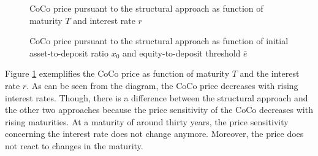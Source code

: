 \begin{figure}
\centering
    \caption[CoCo price pursuant to the structural approach as function of maturity and interest rate]{CoCo price pursuant to the structural approach as function of maturity $T$ and interest rate $r$}
  \label{fig:sa2}
  \end{figure}

\begin{figure}
\centering
    \caption[CoCo price pursuant to the structural approach as function of asset-to-deposit ratio and equity-to-deposit threshold]{CoCo price pursuant to the structural approach as function of initial asset-to-deposit ratio $x_0$ and equity-to-deposit threshold $\bar{e}$}
  \label{fig:sa3}
  \end{figure}

Figure \ref{fig:sa2} exemplifies the CoCo price as function of maturity $T$ and the interest rate $r$. As can be seen from the diagram, the CoCo price decreases with rising interest rates. Though, there is a difference between the structural approach and the other two approaches because the price sensitivity of the CoCo decreases with rising maturities. At a maturity of around thirty years, the price sensitivity concerning the interest rate does not change anymore. Moreover, the price does not react to changes in the maturity.\\

